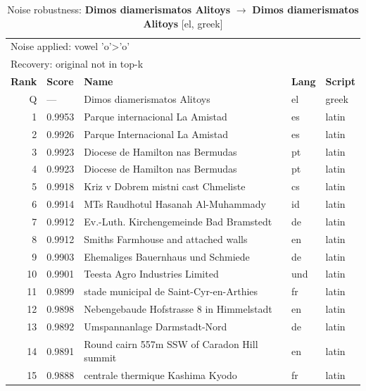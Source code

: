 \begin{table}[htbp]
\centering
\small
\caption{Noise robustness: \textbf{Dimos diamerismatos Alitoys} $\rightarrow$ \textbf{Dimos diamerismatos Alitoys} [el, greek]}
\label{tab:noise-25}
\begin{tabular}{rllll}
\toprule
\multicolumn{5}{l}{\small Noise applied: vowel 'o'>'o'} \\
\multicolumn{5}{l}{\small Recovery: original not in top-k} \\
\midrule
\textbf{Rank} & \textbf{Score} & \textbf{Name} & \textbf{Lang} & \textbf{Script} \\
\midrule
\rowcolor{gray!20} Q & --- & Dimos diamerismatos Alitoys & el & greek \\
\midrule
1 & 0.9953 & Parque internacional La Amistad & es & latin \\
2 & 0.9926 & Parque Internacional La Amistad & es & latin \\
3 & 0.9923 & Diocese de Hamilton nas Bermudas & pt & latin \\
4 & 0.9923 & Diocese de Hamilton nas Bermudas & pt & latin \\
5 & 0.9918 & Kriz v Dobrem mistni cast Chmeliste & cs & latin \\
6 & 0.9914 & MTs Raudhotul Hasanah Al-Muhammady & id & latin \\
7 & 0.9912 & Ev.-Luth. Kirchengemeinde Bad Bramstedt & de & latin \\
8 & 0.9912 & Smiths Farmhouse and attached walls & en & latin \\
9 & 0.9903 & Ehemaliges Bauernhaus und Schmiede & de & latin \\
10 & 0.9901 & Teesta Agro Industries Limited & und & latin \\
11 & 0.9899 & stade municipal de Saint-Cyr-en-Arthies & fr & latin \\
12 & 0.9898 & Nebengebaude Hofstrasse 8 in Himmelstadt & en & latin \\
13 & 0.9892 & Umspannanlage Darmstadt-Nord & de & latin \\
14 & 0.9891 & Round cairn 557m SSW of Caradon Hill summit & en & latin \\
15 & 0.9888 & centrale thermique Kashima Kyodo & fr & latin \\
\bottomrule
\end{tabular}
\end{table}

